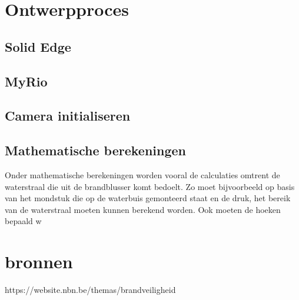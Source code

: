 \documentclass{kulakarticle}
\begin{document}
\section{Ontwerpproces}



\subsection{Solid Edge}

\subsection{MyRio}


\subsection{Camera initialiseren}

\subsection{Mathematische berekeningen}

Onder mathematische berekeningen worden vooral de calculaties omtrent de waterstraal die uit de brandblusser komt bedoelt. Zo moet bijvoorbeeld op basis van het mondstuk die op de waterbuis gemonteerd staat en de druk, het bereik van de waterstraal moeten kunnen berekend worden. Ook moeten de hoeken bepaald w
 

\section*{bronnen}
https://website.nbn.be/themas/brandveiligheid
\end{document}
